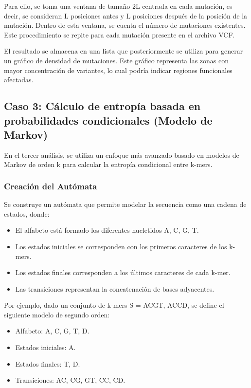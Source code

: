\documentclass[11pt,spanish,listoffigures,listoftables]{tfgetsinf}
\begin{document}
Para ello, se toma una ventana de tamaño 2L centrada en cada mutación, es decir, se consideran L posiciones antes y L posiciones después de la posición de la mutación. Dentro de esta ventana, se cuenta el número de mutaciones existentes. Este procedimiento se repite para cada mutación presente en el archivo VCF.

El resultado se almacena en una lista que posteriormente se utiliza para generar un gráfico de densidad de mutaciones. Este gráfico representa las zonas con mayor concentración de variantes, lo cual podría indicar regiones funcionales afectadas.


\subsection{Caso 3: Cálculo de entropía basada en probabilidades condicionales (Modelo de Markov)}

En el tercer análisis, se utiliza un enfoque más avanzado basado en modelos de Markov de orden k para calcular la entropía condicional entre k-mers.

\subsubsection{Creación del Autómata}

Se construye un autómata que permite modelar la secuencia como una cadena de
estados, donde:

\begin{itemize}
   \item El alfabeto está formado los diferentes nucletidos {A, C, G, T}.
   \item Los estados iniciales se corresponden con los primeros caracteres de los k-mers.
   \item Los estados finales corresponden a los últimos caracteres de cada k-mer.
   \item Las transiciones representan la concatenación de bases adyacentes.
\end{itemize}


Por ejemplo, dado un conjunto de k-mers S = ACGT, ACCD, se define el siguiente modelo de segundo orden:

\begin{itemize}
   \item Alfabeto: {A, C, G, T, D}.
   \item Estados iniciales: {A}.
   \item Estados finales: {T, D}.
   \item Transiciones: {AC, CG, GT, CC, CD}.
\end{itemize}
\end{document}
